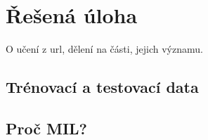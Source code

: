 \chapter{Řešená úloha}

O učení z url, dělení na části, jejich významu.

\section{Trénovací a testovací data}

\section{Proč MIL?}
